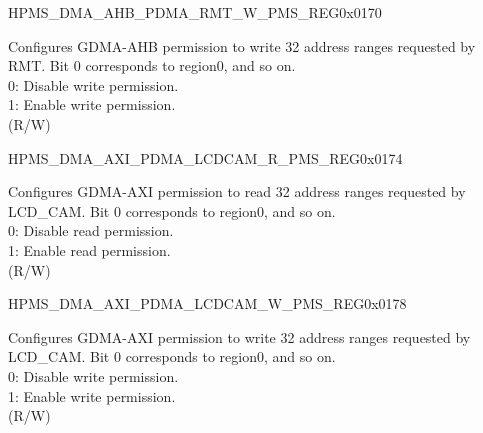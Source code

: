 \begin{register}{H}{PMS\_DMA\_AHB\_PDMA\_RMT\_W\_PMS\_REG}{0x0170}\label{regdesc:PMSDMAAHBPDMARMTWPMSREG}
%
\regnewline%
\begin{regdesc}\begin{reglist}
\label{fielddesc:PMSDMAAHBPDMARMTWPMS}\item [PMS\_DMA\_AHB\_PDMA\_RMT\_W\_PMS] Configures GDMA-AHB permission to write 32 address ranges requested by RMT. Bit 0 corresponds to region0, and so on.\\
0: Disable write permission.\\
1: Enable write permission.\\ (R/W)
\end{reglist}\end{regdesc}
\end{register}


\begin{register}{H}{PMS\_DMA\_AXI\_PDMA\_LCDCAM\_R\_PMS\_REG}{0x0174}\label{regdesc:PMSDMAAXIPDMALCDCAMRPMSREG}
%
\regnewline%
\begin{regdesc}\begin{reglist}
\label{fielddesc:PMSDMAAXIPDMALCDCAMRPMS}\item [PMS\_DMA\_AXI\_PDMA\_LCDCAM\_R\_PMS] Configures GDMA-AXI permission to read 32 address ranges requested by LCD\_CAM. Bit 0 corresponds to region0, and so on.\\
0: Disable read permission.\\
1: Enable read permission.\\ (R/W)
\end{reglist}\end{regdesc}
\end{register}


\begin{register}{H}{PMS\_DMA\_AXI\_PDMA\_LCDCAM\_W\_PMS\_REG}{0x0178}\label{regdesc:PMSDMAAXIPDMALCDCAMWPMSREG}
%
\regnewline%
\begin{regdesc}\begin{reglist}
\label{fielddesc:PMSDMAAXIPDMALCDCAMWPMS}\item [PMS\_DMA\_AXI\_PDMA\_LCDCAM\_W\_PMS] Configures GDMA-AXI permission to write 32 address ranges requested by LCD\_CAM. Bit 0 corresponds to region0, and so on.\\
0: Disable write permission.\\
1: Enable write permission.\\ (R/W)
\end{reglist}\end{regdesc}
\end{register}


